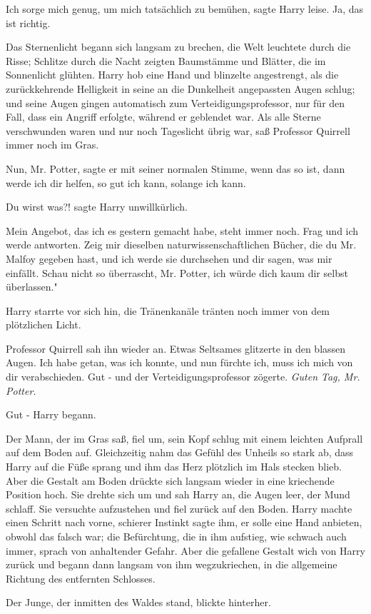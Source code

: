 \glqq Ich sorge mich genug, um mich tatsächlich zu bemühen\grqq{}, sagte Harry
leise. \glqq Ja, das ist richtig.\grqq{}

Das Sternenlicht begann sich langsam zu brechen, die Welt leuchtete durch die
Risse; Schlitze durch die Nacht zeigten Baumstämme und Blätter, die im
Sonnenlicht glühten. Harry hob eine Hand und blinzelte angestrengt, als die
zurückkehrende Helligkeit in seine an die Dunkelheit angepassten Augen schlug;
und seine Augen gingen automatisch zum Verteidigungsprofessor, nur für den Fall,
dass ein Angriff erfolgte, während er geblendet war. Als alle Sterne
verschwunden waren und nur noch Tageslicht übrig war, saß Professor Quirrell
immer noch im Gras.

\glqq Nun, Mr. Potter\grqq{}, sagte er mit seiner normalen Stimme, \glqq wenn
das so ist, dann werde ich dir helfen, so gut ich kann, solange ich kann.\grqq{}

\glqq Du wirst was?!\grqq{} sagte Harry unwillkürlich.

\glqq Mein Angebot, das ich es gestern gemacht habe, steht immer noch. Frag und
ich werde antworten. Zeig mir dieselben naturwissenschaftlichen Bücher, die du
Mr. Malfoy gegeben hast, und ich werde sie durchsehen und dir sagen, was mir
einfällt. Schau nicht so überrascht, Mr. Potter, ich würde dich kaum dir selbst
überlassen."

Harry starrte vor sich hin, die Tränenkanäle tränten noch immer von dem
plötzlichen Licht.

Professor Quirrell sah ihn wieder an. Etwas Seltsames glitzerte in den blassen
Augen. \glqq Ich habe getan, was ich konnte, und nun fürchte ich, muss ich mich
von dir verabschieden. Gut -\grqq{} und der Verteidigungsprofessor zögerte.
\glqq \emph{Guten Tag, Mr. Potter.}\grqq{}

\glqq Gut -\grqq{} Harry begann.

Der Mann, der im Gras saß, fiel um, sein Kopf schlug mit einem leichten Aufprall
auf dem Boden auf. Gleichzeitig nahm das Gefühl des Unheils so stark ab, dass
Harry auf die Füße sprang und ihm das Herz plötzlich im Hals stecken blieb. Aber
die Gestalt am Boden drückte sich langsam wieder in eine kriechende Position
hoch. Sie drehte sich um und sah Harry an, die Augen leer, der Mund schlaff. Sie
versuchte aufzustehen und fiel zurück auf den Boden. Harry machte einen Schritt
nach vorne, schierer Instinkt sagte ihm, er solle eine Hand anbieten, obwohl das
falsch war; die Befürchtung, die in ihm aufstieg, wie schwach auch immer, sprach
von anhaltender Gefahr. Aber die gefallene Gestalt wich von Harry zurück und
begann dann langsam von ihm wegzukriechen, in die allgemeine Richtung des
entfernten Schlosses.

Der Junge, der inmitten des Waldes stand, blickte hinterher.

